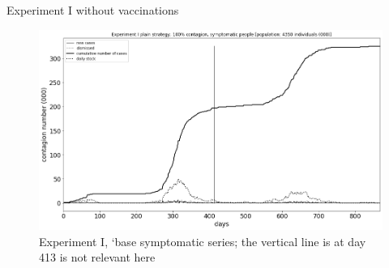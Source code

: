 \documentclass[8pt]{beamer}
\begin{document}
\begin{frame}{Experiment I without vaccinations}

\begin{figure}[H]
\center
\includegraphics[scale=0.16]{Experiment_I_base_symptomatic_series.png} 

\caption{Experiment I, `base symptomatic series; the vertical line is at day 413 is not relevant here} 
\label{Experiment_I_plainSymptomaticSeries}
\end{figure}


\end{frame}

\end{document}
